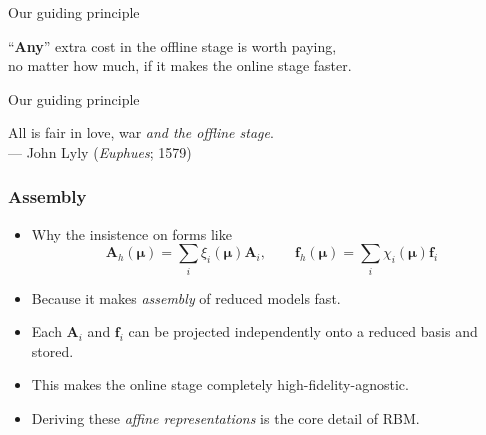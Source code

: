 \documentclass{beamer}
\begin{document}
\begin{frame}
\begin{center}
  \end{center}
\end{frame}

\begin{frame}
  \begin{block}{\centering Our guiding principle}
    \begin{center}
      \vspace{5mm}
      ``\textbf{Any}'' extra cost in the offline stage is worth paying, \\
      no matter how much, if it makes the online stage faster. \\
      \vspace{5mm}
    \end{center}
  \end{block}
\end{frame}

\begin{frame}
  \begin{block}{\centering Our guiding principle}
    \begin{center}
      \vspace{5mm}
      All is fair in love, war \emph{and the offline stage}. \\
      --- John Lyly (\emph{Euphues}; 1579)
      \vspace{5mm}
    \end{center}
  \end{block}
\end{frame}

\begin{frame}
  \frametitle{Assembly}

  \begin{itemize}
  \item Why the insistence on forms like
    \[
      \bm A_h(\bm \mu) = \textstyle \sum_i \xi_i(\bm \mu) \bm A_i, \qquad
      \bm f_h(\bm \mu) = \textstyle \sum_i \chi_i(\bm \mu) \bm f_i
    \]
  \item Because it makes \emph{assembly} of reduced models fast.
  \item Each $\bm A_i$ and $\bm f_i$ can be projected independently onto a reduced basis and stored.
  \item This makes the online stage completely high-fidelity-agnostic.
  \item Deriving these \emph{affine representations} is the core detail of RBM.
  \end{itemize}
\end{frame}
\end{document}
